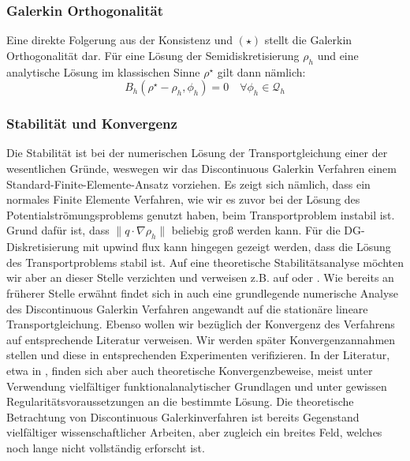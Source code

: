 \subsubsection{Galerkin Orthogonalität}
Eine direkte Folgerung aus der Konsistenz und $ (\star) $ stellt die Galerkin Orthogonalität dar. Für eine Lösung der Semidiskretisierung $ \rho_h $ und eine analytische Lösung im klassischen Sinne $ \rho^{\star} $ gilt dann nämlich:
\[
 B_h(\rho^{\star}-\rho_h,\phi_h ) = 0 \quad \forall \phi_h \in \mathcal{Q}_h
\]
\subsubsection{Stabilität und Konvergenz}
Die Stabilität ist bei der numerischen Lösung der Transportgleichung einer der wesentlichen Gründe, weswegen wir das Discontinuous Galerkin Verfahren einem Standard-Finite-Elemente-Ansatz vorziehen. Es zeigt sich nämlich, dass ein normales Finite Elemente Verfahren, wie wir es zuvor bei der Lösung des Potentialströmungsproblems genutzt haben, beim Transportproblem instabil ist. Grund dafür ist, dass $ \lVert q \cdot \nabla \rho_h \rVert $ beliebig groß werden kann. Für die DG-Diskretisierung mit upwind flux kann hingegen gezeigt werden, dass die Lösung des Transportproblems stabil ist. Auf eine theoretische Stabilitätsanalyse möchten wir aber an dieser Stelle verzichten und verweisen z.B. auf \cite{Har08b} oder \cite{ern2004theory}. Wie bereits an früherer Stelle erwähnt findet sich in \cite{Har08b} auch eine grundlegende numerische Analyse des Discontinuous Galerkin Verfahren angewandt auf die stationäre lineare Transportgleichung.
Ebenso wollen wir bezüglich der Konvergenz des Verfahrens auf entsprechende Literatur verweisen. Wir werden später Konvergenzannahmen stellen und diese in entsprechenden Experimenten verifizieren. In der Literatur, etwa in \cite{di2011mathematical}, finden sich aber auch theoretische Konvergenzbeweise, meist unter Verwendung vielfältiger funktionalanalytischer Grundlagen und unter gewissen Regularitätsvoraussetzungen an die bestimmte Lösung. Die theoretische Betrachtung von Discontinuous Galerkinverfahren ist bereits Gegenstand vielfältiger wissenschaftlicher Arbeiten, aber zugleich ein breites Feld, welches noch lange nicht vollständig erforscht ist. \\





